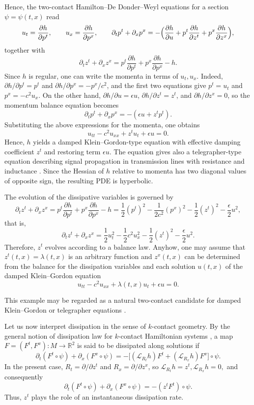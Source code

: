\documentclass[11pt,a4paper]{article}
\newcommand{\Lie}{\mathcal{L}}
\theoremstyle{plain} \newtheorem{theorem}{Theorem}[section] \newtheorem{proposition}[theorem]{Proposition} \newtheorem{corollary}[theorem]{Corollary} \newtheorem{lemma}[theorem]{Lemma} \theoremstyle{definition} \newtheorem{definition}[theorem]{Definition} \theoremstyle{remark} \newtheorem{remark}[theorem]{Remark} \newtheorem{example}[theorem]{Example} %
\begin{document}
Hence, the two-contact Hamilton--De Donder--Weyl equations for a section \(\psi=\psi(t,x)\) read
\[
u_{t}=\frac{\partial h}{\partial p^{t}},\qquad
u_{x}=\frac{\partial h}{\partial p^{x}},\qquad
\partial_{t}p^{t}+\partial_{x}p^{x}
=
-\Bigl(\frac{\partial h}{\partial u}
+p^{t}\frac{\partial h}{\partial z^{t}}
+p^{x}\frac{\partial h}{\partial z^{x}}\Bigr),
\]
together with
\[
\partial_{t}z^{t}+\partial_{x}z^{x}
=
p^{t}\frac{\partial h}{\partial p^{t}}
+p^{x}\frac{\partial h}{\partial p^{x}}
-h.
\]
Since $h$ is regular, one can write the momenta in terms of $u_t,u_x$. Indeed, \(\partial h/\partial p^{t}=p^{t}\) and \(\partial h/\partial p^{x}=-p^{x}/c^{2}\), and the first two equations give \(p^{t}=u_{t}\) and \(p^{x}=-c^{2}u_{x}\). On the other hand, \(\partial h/\partial u=\epsilon u\), \(\partial h/\partial z^{t}=z^{t}\), and \(\partial h/\partial z^{x}=0\), so the momentum balance equation becomes
\[
\partial_{t}p^{t}+\partial_{x}p^{x}=-(\epsilon u+z^{t}p^{t}).
\]
Substituting the above expressions for the momenta, one obtains
\[
u_{tt}-c^{2}u_{xx}+z^{t}u_{t}+\epsilon u=0.
\]
Hence, \(h\) yields a damped Klein--Gordon-type equation with effective damping coefficient \(z^{t}\) and restoring term \(\epsilon u\). The equation gives also a telegrapher-type equation describing signal propagation in transmission lines with resistance and inductance \cite{SakataWakasugi2017,deLucasLangeSardonRivas2026}. Since the Hessian of $h$ relative to momenta has two diagonal values of opposite sign, the resulting PDE is hyperbolic.

The evolution of the dissipative variables is governed by
\[
\partial_{t}z^{t}+\partial_{x}z^{x}
=
p^{t}\frac{\partial h}{\partial p^{t}}
+p^{x}\frac{\partial h}{\partial p^{x}}
-h
=
\frac12(p^{t})^{2}
-\frac{1}{2c^{2}}(p^{x})^{2}
-\frac12(z^{t})^{2}
-\frac{\epsilon}{2}u^{2},
\]
that is,
\[
\partial_{t}z^{t}+\partial_{x}z^{x}
=
\frac12u_{t}^{2}
-\frac12c^{2}u_{x}^{2}
-\frac12(z^{t})^{2}
-\frac{\epsilon}{2}u^{2}.
\]
Therefore, $z^t$   evolves according to a balance law. Anyhow, one may assume that $z^t(t,x)=\lambda(t,x)$ is an arbitrary function and $z^x(t,x)$ can be determined from the balance for the dissipation variables and each solution $u(t,x)$ of the damped Klein--Gordon equation
$$
u_{tt}-c^2u_{xx}+\lambda(t,x)u_t+\epsilon u=0.
$$

This example may be regarded as a natural two-contact candidate for damped Klein--Gordon or telegrapher equations \cite{Wakasugi2012,AncoMarquezGarridoGandarias2024}.

Let us now interpret dissipation in the sense of $k$-contact geometry. By the general notion of dissipation law for $k$-contact Hamiltonian systems \cite{GGMRR_20}, a map \(F=(F^{t},F^{x})\colon M\to\mathbb{R}^{2}\) is said to be dissipated along solutions if
\[
\partial_{t}(F^{t}\circ\psi)+\partial_{x}(F^{x}\circ\psi)
=
-\bigl[(\Lie_{R_{t}}h)F^{t}+(\Lie_{R_{x}}h)F^{x}\bigr]\circ\psi.
\]
In the present case, \(R_{t}=\partial/\partial z^{t}\) and \(R_{x}=\partial/\partial z^{x}\), so
\(
\Lie_{R_{t}}h=z^{t},  \Lie_{R_{x}}h=0,
\)
and consequently
\[
\partial_{t}(F^{t}\circ\psi)+\partial_{x}(F^{x}\circ\psi)
=
-(z^{t}F^{t})\circ\psi.
\]
Thus, \(z^{t}\) plays the role of an instantaneous dissipation rate.
\end{document}
